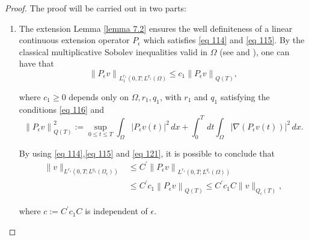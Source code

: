 \begin{proof}
The proof will be carried out in two parts:
\begin{enumerate}[label=(\roman*)]
\item The extension Lemma \eqref{lemma 7.2} ensures the well definiteness of a linear continuous extension operator $P_{\epsilon}$ which satisfies \eqref{eq 114} and \eqref{eq 115}. By the classical multiplicative Sobolev inequalities valid in $\Omega$ (see \cite{Ladyzenskaja_Solonnikov_Uralceva_1968} and \cite{Nittka_2011}), one can have that
\begin{equation}
  \left\|P_{\epsilon} v\right\|_{L_{1}^{r_{1}}\left(0, T ; L^{q_{1}}(\Omega)\right.} \leq c_{1}\left\|P_{\epsilon} v\right\|_{Q(T)},
\label{eq 121}\end{equation}


where $c_{1} \geq 0$ depends only on $\Omega, r_{1}, q_{1}$, with $r_{1}$ and $q_{1}$ satisfying the conditions \eqref{eq 116} and
\begin{equation}
  \left\|P_{\epsilon} v\right\|_{Q(T)}^{2}:=\sup _{0 \leq t \leq T} \int_{\Omega}\left|P_{\epsilon} v(t)\right|^{2} \, d  x+\int_{0}^{T} \, d  t \int_{\Omega}\left|\nabla\left(P_{\epsilon} v(t)\right)\right|^{2} \, d  x.
\label{eq 122}\end{equation}

By using \eqref{eq 114},\eqref{eq 115} and \eqref{eq 121}, it is possible to conclude that
\begin{equation}
  \begin{aligned}
\|v\|_{L^{r_{1}}\left(0, T ; L^{q_{1}}\left(\Omega_{\epsilon}\right)\right)} & \leq C^{\prime}\left\|P_{\epsilon} v\right\|_{L^{r_{1}}\left(0, T ; L^{q_{1}}(\Omega)\right)} \\
& \leq C^{\prime} c_{1}\left\|P_{\epsilon} v\right\|_{Q(T)} \leq C^{\prime} c_{1} C\|v\|_{Q_{\epsilon}(T)},
\end{aligned}
\label{eq 123}\end{equation}


where $c:=C^{\prime} c_{1} C$ is independent of $\epsilon$.


\end{enumerate}
\end{proof}
